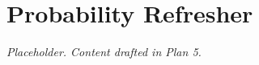 \chapter{Probability Refresher}
\label{app:probability}

\textit{Placeholder. Content drafted in Plan 5.}
